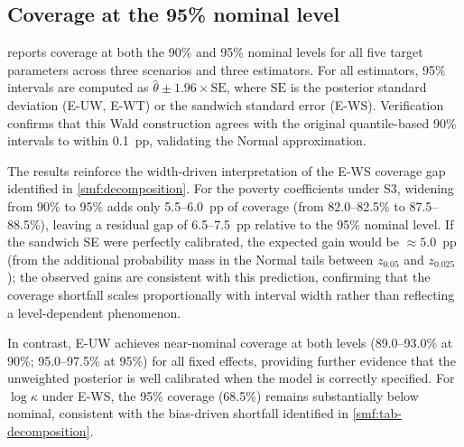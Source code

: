 
\subsection{Coverage at the 95\% nominal level}
\label{smf:coverage95}

 reports coverage at both the 90\% and 95\%
nominal levels for all five target parameters across three scenarios and
three estimators.  For all estimators, 95\% intervals are computed as
$\hat\theta \pm 1.96 \times \mathrm{SE}$, where $\mathrm{SE}$ is the
posterior standard deviation (E-UW, E-WT) or the sandwich standard error
(E-WS).  Verification confirms that this Wald construction agrees with
the original quantile-based 90\% intervals to within 0.1~pp, validating
the Normal approximation.

\begin{table}[htbp]
\centering
\caption{Interval coverage (\%) at 90\% and 95\% nominal levels.
  Parenthetical values are MCSEs ($= \sqrt{\hat{p}(1 - \hat{p})/R}$;
  $R = 200$).  At the 95\% nominal level, $\mathrm{MCSE} \approx 1.5$~pp.}
\label{smf:tab-coverage95}

\end{table}

The results reinforce the width-driven interpretation of the E-WS
coverage gap identified in \cref{smf:decomposition}.  For the poverty
coefficients under S3, widening from 90\% to 95\% adds only
5.5--6.0~pp of coverage (from 82.0--82.5\% to 87.5--88.5\%), leaving
a residual gap of 6.5--7.5~pp relative to the 95\% nominal level.
If the sandwich SE were perfectly calibrated, the expected gain would be
$\approx 5.0$~pp (from the additional probability mass in the Normal
tails between $z_{0.05}$ and $z_{0.025}$); the observed gains are
consistent with this prediction, confirming that the coverage shortfall
scales proportionally with interval width rather than reflecting a
level-dependent phenomenon.

In contrast, E-UW achieves near-nominal coverage at both levels
(89.0--93.0\% at 90\%; 95.0--97.5\% at 95\%) for all fixed effects,
providing further evidence that the unweighted posterior is well
calibrated when the model is correctly specified.  For
$\log\kappa$ under E-WS, the 95\% coverage (68.5\%) remains
substantially below nominal, consistent with the bias-driven shortfall
identified in \cref{smf:tab-decomposition}.
